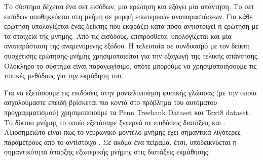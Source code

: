 Το σύστημα δέχεται ένα σετ εισόδων, μια ερώτηση και εξάγει μία απάντηση. 
Το σετ εισόδων αποθηκεύεται στη μνήμη σε μορφή εσωτερικών αναπαραστάσεων. Για κάθε ερώτηση υπολογίζεται ένας δείκτης που εκφράζει κατά πόσο αντιστοιχεί η ερώτηση με τα στοιχεία της μνήμης.
Από τις εισόδους, επιπρόσθετα, υπολογίζεται και μία αναπαράσταση της αναμενόμενης εξόδου.
Η τελευταία σε συνδυασμό με τον δείκτη συσχέτισης ερώτησης-μνήμης χρησιμοποιείται για την εξαγωγή της τελικής απάντησης. Ολόκληρο το σύστημα είναι παραγωγίσιμο, οπότε μπορούμε να χρησιμοποιήσουμε τις τυπικές μεθόδους για την εκμάθηση του.

Για να εξετάσουμε τις επιδόσεις στην μοντελοποίηση φυσικής γλώσσας (με την οποία ασχολούμαστε επειδή βρίσκεται πιο κοντά στο πρόβλημα του αυτόματου προγραμματισμού) χρησιμοποιούμε τα Penn Treebank Dataset και Text8 dataset. Το δίκτυο μνήμης το οποίο εξετάσαμε ξεπερνά σε επιδόσεις διατάξεις  και . Αξιοσημειώτο είναι πως το νευρωνικό μοντέλο μνήμης έχει σημαντικά λιγότερες παραμέτρους από το αντίστοιχο . Σε ακόμα ένα πείραμα, έτσι, υποδεικνύεται η σημαντικότητα ύπαρξης εξωτερικής μνήμης στις διατάξεις εκμάθησης.

\section{}

